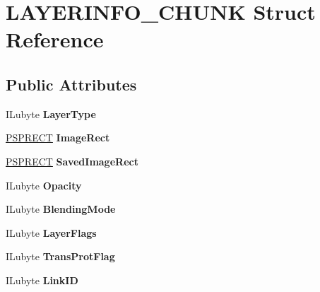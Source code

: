 \hypertarget{structLAYERINFO__CHUNK}{}\section{L\+A\+Y\+E\+R\+I\+N\+F\+O\+\_\+\+C\+H\+U\+NK Struct Reference}
\label{structLAYERINFO__CHUNK}
\subsection*{Public Attributes}
\begin{DoxyCompactItemize}
\item 
\mbox{\label{structLAYERINFO__CHUNK_afbe1b3f9a5336e6144190b0da6d036bf}} 
I\+Lubyte {\bfseries Layer\+Type}
\item 
\mbox{\label{structLAYERINFO__CHUNK_ad65f50a6e2754ae4f66b4b66dfb42b3f}} 
\hyperlink{structPSPRECT}{P\+S\+P\+R\+E\+CT} {\bfseries Image\+Rect}
\item 
\mbox{\label{structLAYERINFO__CHUNK_a220080293c3448968483b4df1216fd7c}} 
\hyperlink{structPSPRECT}{P\+S\+P\+R\+E\+CT} {\bfseries Saved\+Image\+Rect}
\item 
\mbox{\label{structLAYERINFO__CHUNK_abee84eadc73d022109dda0117eaf4418}} 
I\+Lubyte {\bfseries Opacity}
\item 
\mbox{\label{structLAYERINFO__CHUNK_a8fde034769abb95a3fb810ea3001eb7f}} 
I\+Lubyte {\bfseries Blending\+Mode}
\item 
\mbox{\label{structLAYERINFO__CHUNK_a4688022070f64feedaa2154b2d892b08}} 
I\+Lubyte {\bfseries Layer\+Flags}
\item 
\mbox{\label{structLAYERINFO__CHUNK_a57068757f3d3d8d5640d2b986fcebd30}} 
I\+Lubyte {\bfseries Trans\+Prot\+Flag}
\item 
\mbox{\label{structLAYERINFO__CHUNK_a32d515184ffc97ebbb7b9a830a6fab39}} 
I\+Lubyte {\bfseries Link\+ID}
\item 
\mbox{\label{structLAYERINFO__CHUNK_af9f714017301960cdf22409e0584c1e4}} 

\end{DoxyCompactItemize}

